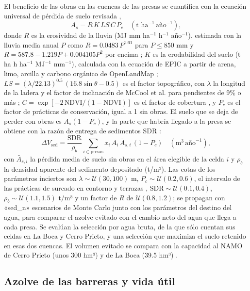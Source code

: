 El beneficio de las obras en las cuencas de las presas se cuantifica con la ecuación universal de pérdida de suelo revisada ,
\begin{equation}
A_s = R\,K\,LS\,C\,P_c \quad (\text{t ha}^{-1}\,\text{año}^{-1}),
\end{equation}
donde $R$ es la erosividad de la lluvia (MJ mm ha$^{-1}$ h$^{-1}$ año$^{-1}$), estimada con la lluvia media anual $P$ como $R=0.0483\,P^{1.61}$ para $P\le850$ mm y $R=587.8-1.219P+0.004105P^2$ por encima ; $K$ es la erodabilidad del suelo (t ha h ha$^{-1}$ MJ$^{-1}$ mm$^{-1}$), calculada con la ecuación de EPIC a partir de arena, limo, arcilla y carbono orgánico de OpenLandMap ; $LS=(\lambda/22.13)^{0.5}\,(16.8\sin\theta-0.5)$ es el factor topográfico, con $\lambda$ la longitud de la ladera y el factor de inclinación de McCool et al. para pendientes de 9\% o más ; $C=\exp[-2\,\text{NDVI}/(1-\text{NDVI})]$ es el factor de cobertura , y $P_c$ es el factor de prácticas de conservación, igual a 1 sin obras. El suelo que se deja de perder con obras es $A_s(1-P_c)$, y la parte que habría llegado a la presa se obtiene con la razón de entrega de sedimentos $\text{SDR}$ :
\begin{equation}
\Delta V_{\text{sed}}=\frac{\text{SDR}}{\rho_b}\sum_{i\in\text{presas}} x_i\,A_i\,\bar A_{s,i}\,(1-P_c)\quad(\text{m}^3\,\text{año}^{-1}),
\end{equation}
con $\bar A_{s,i}$ la pérdida media de suelo sin obras en el área elegible de la celda $i$ y $\rho_b$ la densidad aparente del sedimento depositado (t/m³). Las cotas de los parámetros inciertos son $\lambda\sim\mathcal U(30,100)$ m, $P_c\sim\mathcal U(0.2,0.6)$, el intervalo de las prácticas de surcado en contorno y terrazas , $\text{SDR}\sim\mathcal U(0.1,0.4)$, $\rho_b\sim\mathcal U(1.1,1.5)$ t/m³ y un factor de $R$ de $\mathcal U(0.8,1.2)$; se propagan con «sed_n» escenarios de Monte Carlo junto con los parámetros del destino del agua, para comparar el azolve evitado con el cambio neto del agua que llega a cada presa. Se evalúan la selección por agua bruta, de la que sólo cuentan sus celdas en La Boca y Cerro Prieto, y una selección que maximiza el suelo retenido en esas dos cuencas. El volumen evitado se compara con la capacidad al NAMO de Cerro Prieto (unos 300 hm³) y de La Boca (39.5 hm³) .

\subsection{Azolve de las barreras y vida útil}\label{sec:vidautil}

